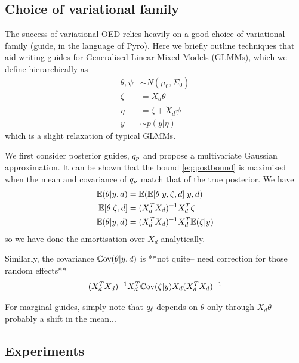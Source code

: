 \subsection{Choice of variational family}
The success of variational OED relies heavily on a good choice of variational family (guide, in the language of Pyro). Here we briefly outline techniques that aid writing guides for Generalised Linear Mixed Models (GLMMs), which we define hierarchically as
\begin{align}
	\theta, \psi &\sim N(\mu_0, \Sigma_0) \\
	\zeta &= X_d\theta \\
	\eta &= \zeta + \tilde{X}_d \psi \\
	y &\sim p(y|\eta)
\end{align}
which is a slight relaxation of typical GLMMs.

We first consider posterior guides, $q_p$ and propose a multivariate Gaussian approximation. It can be shown that the bound \eqref{eq:postbound} is maximised when the mean and covariance of $q_p$ match that of the true posterior. We have
\begin{align}
	\mathbb{E}(\theta|y, d) &= \mathbb{E}(\mathbb{E}[\theta|y,\zeta, d]|y, d) \\
	\mathbb{E}[\theta|\zeta, d] &= (X_d^T X_d)^{-1}X_d^T \zeta \\
	\mathbb{E}(\theta|y, d) &= (X_d^T X_d)^{-1}X_d^T \mathbb{E}(\zeta|y)
\end{align}
so we have done the amortisation over $X_d$ analytically.

Similarly, the covariance $\mathbb{C}\text{ov}(\theta|y,d)$ is
**not quite-- need correction for those random effects**
\begin{align}
	(X_d^TX_d)^{-1}X_d^T\mathbb{C}\text{ov}(\zeta|y)X_d(X_d^TX_d)^{-1}
\end{align}

For marginal guides, simply note that $q_\ell$ depends on $\theta$ only through $X_d\theta$ --probably a shift in the mean...

\subsection{Experiments}
\label{sec:experiments}

